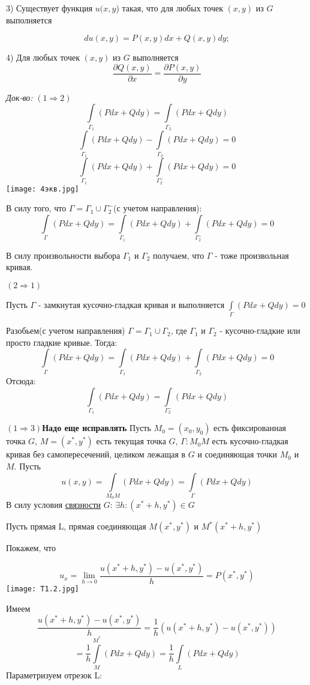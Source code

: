 \documentclass[12pt]{article}
\begin{document}
3) Существует функция $u(x, y$) такая, что для любых 
точек $(x, y)$ из $G$ выполняется

$$
du(x, y) = P(x, y) dx + Q(x, y) dy;
$$

4) Для любых точек $(x, y)$ из $G$ выполняется
$$
\frac{\partial Q(x,y)}{\partial x} = \frac{\partial P(x,y)}{\partial y} 
$$

\textit{Док-во:} 
$(1 \Rightarrow 2)$
$$
\int\limits_{\Gamma_1} (Pdx + Qdy) 
=
\int\limits_{\Gamma_2} (Pdx + Qdy) 
$$
$$
\int\limits_{\Gamma_1} (Pdx + Qdy) 
-
\int\limits_{\Gamma_2} (Pdx + Qdy) 
=
0
$$
$$
\int\limits_{\Gamma_1} (Pdx + Qdy) 
+
\int\limits_{\Gamma_2^-} (Pdx + Qdy) 
=
0
$$
\texttt{[image: 4экв.jpg]}	

В силу того, что $\Gamma = \Gamma_1 \cup \Gamma_2^-$(с учетом направления):
$$
\int\limits_{\Gamma} (Pdx + Qdy) 
=
\int\limits_{\Gamma_1} (Pdx + Qdy) 
+
\int\limits_{\Gamma_2^-} (Pdx + Qdy) 
=
0
$$

В силу произвольности выбора $\Gamma_1$ и $\Gamma_2$ получаем, что $\Gamma$ - тоже произвольная кривая.


$(2 \Rightarrow 1)$

	Пусть $\Gamma$ - замкнутая кусочно-гладкая кривая
	и выполняется $\int\limits_{\Gamma} (Pdx + Qdy) = 0$
	
Разобьем(с учетом направления) $\Gamma = \Gamma_1 \cup \Gamma_2$, где $\Gamma_1$ и $\Gamma_2$ - кусочно-гладкие или просто гладкие кривые.
Тогда:
$$
\int\limits_{\Gamma} (Pdx + Qdy) 
=
\int\limits_{\Gamma_1} (Pdx + Qdy) 
+
\int\limits_{\Gamma_2} (Pdx + Qdy) 
=
0
$$
Отсюда:
$$
\int\limits_{\Gamma_1} (Pdx + Qdy) 
=
\int\limits_{\Gamma_2^-} (Pdx + Qdy) 
$$

$(1 \Rightarrow 3)$\textbf{Надо еще исправлять}
Пусть $M_0 = (x_0, y_0)$ есть фиксированная точка $G$, $M = (x^*, y^*)$ есть текущая точка $G$, $\Gamma : M_0M$ есть кусочно-гладкая кривая без самопересечений,
целиком лежащая в $G$ и соединяющая точки $M_0$ и $M$.
Пусть 
$$
u(x,y) = \int\limits_{M_0M} (Pdx + Qdy) 
=
\int\limits_{\Gamma} (Pdx + Qdy) 
$$
В силу условия \hyperref[eq4]{связности} $G$:
$ \exists h : (x^* + h , y^*) \in G$

Пусть прямая L, прямая соединяющая $M(x^* , y^*)$ и $M^*(x^* + h , y^*)$

Покажем, что 

$$u_x = \lim_{h \to 0}\frac{u(x^* + h , y^*) - u(x^* , y^*)}{h} = P(x^* , y^*) $$
\texttt{[image: Т1.2.jpg]}	

Имеем
$$
\frac{u(x^* + h , y^*) - u(x^* , y^*)}{h} 
= 
\frac{1}{h}(u(x^* + h , y^*) - u(x^* , y^*))
$$
$$
=
\frac{1}{h} \int\limits_{M}^{M^*} (Pdx + Qdy)
=
\frac{1}{h} \int\limits_{L} (Pdx + Qdy)
$$
Параметризуем отрезок L:
\end{document}
